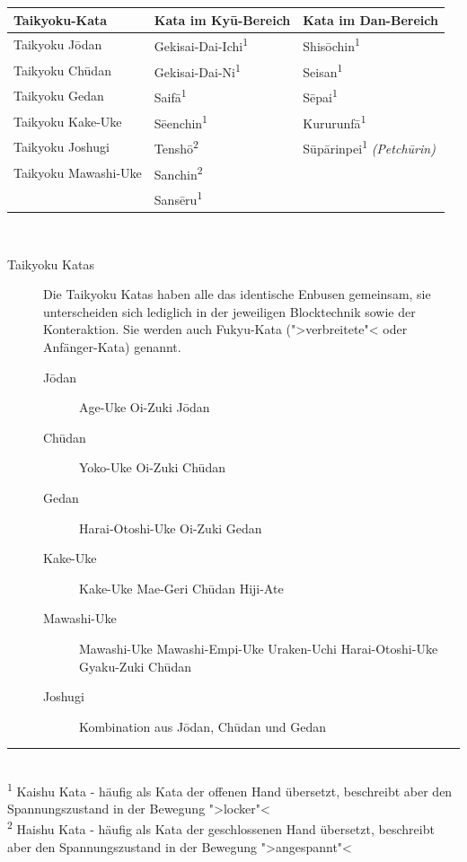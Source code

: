 \documentclass[a5paper,landscape,DIV=calc,11pt,notitlepage]{scrartcl}
\newcommand{\bull}{\,\textbullet\,}
\begin{document}
\begin{tcolorbox}[colback=white,colframe=GKD,coltitle=white,adjusted title=Kata des G\={o}j\={u}-Ry\={u} Karate-D\={o}]
	\null\vfill\null
	\begin{tabularx}{\linewidth}{XXX}
		\textbf{Taikyoku-Kata}	& \textbf{Kata im Ky\={u}-Bereich}	& \textbf{Kata im Dan-Bereich}\\
		\midrule
		{\small Taikyoku J\={o}dan}		&{\small Gekisai-Dai-Ichi\textsuperscript{1}}	&{\small Shis\={o}chin\textsuperscript{1}}\\
		{\small Taikyoku Ch\={u}dan}	&{\small Gekisai-Dai-Ni\textsuperscript{1}}	&{\small Seisan\textsuperscript{1}}\\
		{\small Taikyoku Gedan}			&{\small Saif\={a}\textsuperscript{1}}			&{\small S\={e}pai\textsuperscript{1}}\\
		{\small Taikyoku Kake-Uke}		&{\small S\={e}enchin\textsuperscript{1}}		&{\small Kururunf\={a}\textsuperscript{1}}\\
		{\small Taikyoku Joshugi}		&{\small Tensh\={o}\textsuperscript{2}}		&{\small S\={u}p\={a}rinpei\textsuperscript{1}} \textit{(Petch\={u}rin)}\\
		{\small Taikyoku Mawashi-Uke}	&{\small Sanchin\textsuperscript{2}}			&\\
										&{\small Sans\={e}ru\textsuperscript{1}}		&\\
	\end{tabularx}\\
	{\small	
	\begin{description}
		\item[Taikyoku Katas] Die Taikyoku Katas haben alle das identische Enbusen gemeinsam, sie unterscheiden sich lediglich in der jeweiligen Blocktechnik sowie der Konteraktion. Sie werden auch Fukyu-Kata (">verbreitete"< oder Anfänger-Kata) genannt.
		\begin{description}
			\item[J\={o}dan] \tabto{50pt}Age-Uke\bull Oi-Zuki J\={o}dan
			\item[Ch\={u}dan] \tabto{50pt}Yoko-Uke\bull Oi-Zuki Ch\={u}dan
			\item[Gedan] \tabto{50pt}Harai-Otoshi-Uke\bull Oi-Zuki Gedan
			\item[Kake-Uke]\tabto{50pt}Kake-Uke\bull Mae-Geri Ch\={u}dan\bull Hiji-Ate
			\item[Mawashi-Uke] \tabto{50pt}Mawashi-Uke\bull Mawashi-Empi-Uke\bull Uraken-Uchi\bull Harai-Otoshi-Uke\bull Gyaku-Zuki Ch\={u}dan
			\item[Joshugi] \tabto{50pt}Kombination aus J\={o}dan, Ch\={u}dan und Gedan
		\end{description}
	\end{description}\bigskip\rule{141pt}{.4pt}\\
	{\footnotesize
	\textsuperscript{1} Kaishu Kata - häufig als Kata der offenen Hand übersetzt, beschreibt aber den Spannungszustand in der Bewegung ">locker"<\\
	\textsuperscript{2} Haishu Kata - häufig als Kata der geschlossenen Hand übersetzt, beschreibt aber den Spannungszustand in der Bewegung ">angespannt"<}
	}\null\vfill\null
\end{tcolorbox}
\end{document}
